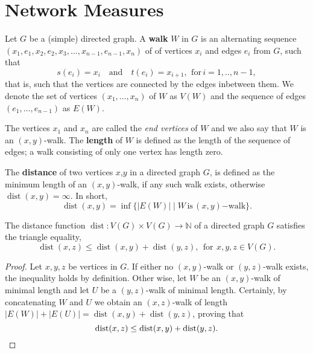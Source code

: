 







\section{Network Measures}\label{sec:network_measures}


Let $G$ be a (simple) directed graph. A \textbf{walk} $W$ in $G$ is an
alternating sequence
$(x_1,e_1,x_2,e_2,x_3,\ldots,x_{n-1},e_{n-1},x_n)$ of of vertices
$x_i$ and edges $e_i$ from $G$, such that
\[
s(e_i) = x_i \quad \mathrm{and} \quad t(e_i) = x_{i+1}, \:\,
\mathrm{for}\, i=1,..,n-1,
\]
that is, such that the vertices are connected by the edges inbetween
them. We denote the set of vertices $(x_1,\ldots,x_n)$ of $W$ as
$V(W)$ and the sequence of edges $(e_1,\dots,e_{n-1})$ as $E(W)$.

The vertices $x_1$ and $x_n$ are called the \textit{end vertices} of
$W$ and we also say that $W$ is an $(x,y)$-walk. The \textbf{length}
of $W$ is defined as the length of the sequence of edges; a walk
consisting of only one vertex has length zero.

\begin{definition}[Distance]
  The \textbf{distance} of two vertices $x$,$y$ in a directed graph
  $G$, is defined as the minimum length of an
  $(x,y)$-walk, if any such walk exists, otherwise
  $\operatorname{dist}(x,y)=\infty$. In short,
  \[
  \operatorname{dist}(x,y) = \inf \{|E(W)| \mid
  W\,\mathrm{is}\,(x,y)\mathrm{-walk}\}.
  \]
\end{definition}

\begin{proposition}
  The distance function $\operatorname{dist}: V(G) \times V(G) \to
  \mathbb{N}$ of a directed graph $G$ satisfies the triangle equality,
  \[
  \operatorname{dist}(x,z) \le \operatorname{dist}(x,y) +
  \operatorname{dist}(y,z), \:\: \mathrm{for}\:\, x,y,z \in V(G).
  \]
\end{proposition}

\begin{proof}
  Let $x,y,z$ be vertices in $G$. If either no $(x,y)$-walk or
  $(y,z)$-walk exists, the inequality holds by definition. Other wise,
  let $W$ be an $(x,y)$-walk of minimal length and let $U$ be a
  $(y,z)$-walk of minimal length. Certainly, by concatenating $W$ and
  $U$ we obtain an $(x,z)$-walk of length $|E(W)| + |E(U)| =
  \operatorname{dist}(x,y) + \operatorname{dist}(y,z)$, proving
  that \[ \operatorname{dist}(x,z) \le \operatorname{dist}(x,y) +
  \operatorname{dist}(y,z).\qedhere\]\end{proof}


